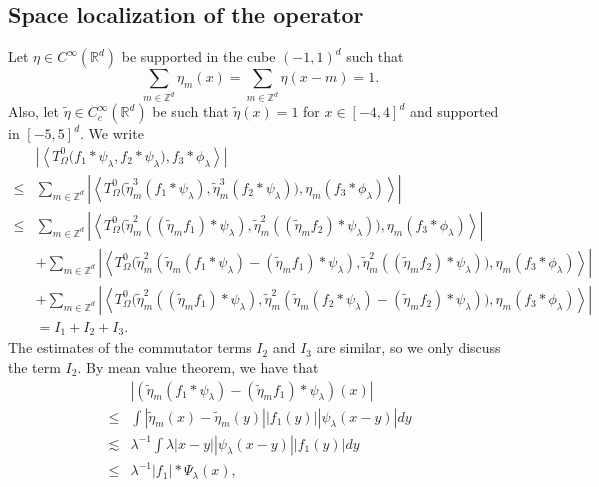 \documentclass[a4paper,reqno]{amsart}
\newcommand{\R}{{\mathbb R}}       %
\newcommand{\Z}{{\mathbb Z}}
\theoremstyle{definition}
\numberwithin{equation}{section}
\begin{document}
\subsection{Space localization of the operator}
Let $\eta\in C^\infty(\R^d)$ be supported in the cube $(-1,1)^d$ such that 
\begin{equation}\label{eqn:parofunity}
	\sum_{m\in\Z^d}\eta_m(x)=\sum_{m\in\Z^d}\eta(x-m)=1.
\end{equation}
Also, let $\widetilde{\eta}\in C_c^\infty(\R^d)$ be such that $\widetilde{\eta}(x)=1$ for $x\in[-4,4]^d$ and supported in $\left[-5,5\right]^d$. We write
\begin{align*}
	&\left|\left\langle T^0_\Omega\Big(f_1*\psi_\lambda,f_2*\psi_\lambda\Big),f_3*\phi_{\lambda}\right\rangle\right|\\
	\leq&\sum_{m\in\Z^d}\left|\left\langle T^0_\Omega\Big(\widetilde\eta_m^3(f_1*\psi_\lambda),\widetilde\eta_m^3(f_2*\psi_\lambda)\Big),\eta_m(f_3*\phi_{\lambda})\right\rangle\right|\\
	\leq&\sum_{m\in\Z^d}\left|\left\langle T^0_\Omega\Big(\widetilde\eta_m^2((\widetilde\eta_mf_1)*\psi_\lambda),\widetilde\eta_m^2((\widetilde\eta_mf_2)*\psi_\lambda)\Big),\eta_m(f_3*\phi_{\lambda})\right\rangle\right|\\
	&+\sum_{m\in\Z^d}\left|\left\langle T^0_\Omega\Big(\widetilde\eta_m^2(\widetilde\eta_m(f_1*\psi_\lambda)-(\widetilde\eta_mf_1)*\psi_\lambda),\widetilde\eta_m^2((\widetilde\eta_mf_2)*\psi_\lambda)\Big),\eta_m(f_3*\phi_{\lambda})\right\rangle\right|\\
	&+\sum_{m\in\Z^d}\left|\left\langle T^0_\Omega\Big(\widetilde\eta_m^2((\widetilde\eta_mf_1)*\psi_\lambda),\widetilde\eta_m^2(\widetilde\eta_m(f_2*\psi_\lambda)-(\widetilde\eta_mf_2)*\psi_\lambda)\Big),\eta_m(f_3*\phi_{\lambda})\right\rangle\right|\\
	&=I_1+I_2+I_3.
\end{align*}
The estimates of the commutator terms $I_2$ and $I_3$ are similar, so we only discuss the term $I_2$. By mean value theorem, we have that
\begin{align*}
	&\left|(\widetilde\eta_m(f_1*\psi_\lambda)-(\widetilde\eta_mf_1)*\psi_\lambda)(x)\right|\\
	\leq&\int|\widetilde\eta_m(x)-\widetilde\eta_m(y)||f_1(y)||\psi_\lambda(x-y)|dy\\
	\lesssim&\lambda^{-1}\int\lambda|x-y||\psi_\lambda(x-y)||f_1(y)|dy\\
	\leq&\lambda^{-1}|f_1|*\Psi_\lambda(x),
\end{align*}
\end{document}
